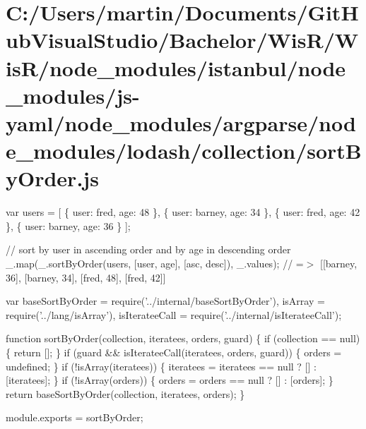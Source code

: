 \hypertarget{_c_1_2_users_2martin_2_documents_2_git_hub_visual_studio_2_bachelor_2_wis_r_2_wis_r_2node_module632f58d855bd69b741808971828f40a0}{}\section{C\+:/\+Users/martin/\+Documents/\+Git\+Hub\+Visual\+Studio/\+Bachelor/\+Wis\+R/\+Wis\+R/node\+\_\+modules/istanbul/node\+\_\+modules/js-\/yaml/node\+\_\+modules/argparse/node\+\_\+modules/lodash/collection/sort\+By\+Order.\+js}
var users = \mbox{[} \{ \textquotesingle{}user\textquotesingle{}\+: \textquotesingle{}fred\textquotesingle{}, \textquotesingle{}age\textquotesingle{}\+: 48 \}, \{ \textquotesingle{}user\textquotesingle{}\+: \textquotesingle{}barney\textquotesingle{}, \textquotesingle{}age\textquotesingle{}\+: 34 \}, \{ \textquotesingle{}user\textquotesingle{}\+: \textquotesingle{}fred\textquotesingle{}, \textquotesingle{}age\textquotesingle{}\+: 42 \}, \{ \textquotesingle{}user\textquotesingle{}\+: \textquotesingle{}barney\textquotesingle{}, \textquotesingle{}age\textquotesingle{}\+: 36 \} \mbox{]};

// sort by {\ttfamily user} in ascending order and by {\ttfamily age} in descending order \+\_\+.\+map(\+\_\+.\+sort\+By\+Order(users, \mbox{[}\textquotesingle{}user\textquotesingle{}, \textquotesingle{}age\textquotesingle{}\mbox{]}, \mbox{[}\textquotesingle{}asc\textquotesingle{}, \textquotesingle{}desc\textquotesingle{}\mbox{]}), \+\_\+.\+values); // =$>$ \mbox{[}\mbox{[}\textquotesingle{}barney\textquotesingle{}, 36\mbox{]}, \mbox{[}\textquotesingle{}barney\textquotesingle{}, 34\mbox{]}, \mbox{[}\textquotesingle{}fred\textquotesingle{}, 48\mbox{]}, \mbox{[}\textquotesingle{}fred\textquotesingle{}, 42\mbox{]}\mbox{]}


\begin{DoxyCodeInclude}
var baseSortByOrder = require(\textcolor{stringliteral}{'../internal/baseSortByOrder'}),
    isArray = require(\textcolor{stringliteral}{'../lang/isArray'}),
    isIterateeCall = require(\textcolor{stringliteral}{'../internal/isIterateeCall'});

\textcolor{keyword}{function} sortByOrder(collection, iteratees, orders, guard) \{
  \textcolor{keywordflow}{if} (collection == null) \{
    \textcolor{keywordflow}{return} [];
  \}
  \textcolor{keywordflow}{if} (guard && isIterateeCall(iteratees, orders, guard)) \{
    orders = undefined;
  \}
  \textcolor{keywordflow}{if} (!isArray(iteratees)) \{
    iteratees = iteratees == null ? [] : [iteratees];
  \}
  \textcolor{keywordflow}{if} (!isArray(orders)) \{
    orders = orders == null ? [] : [orders];
  \}
  \textcolor{keywordflow}{return} baseSortByOrder(collection, iteratees, orders);
\}

module.exports = sortByOrder;
\end{DoxyCodeInclude}
 